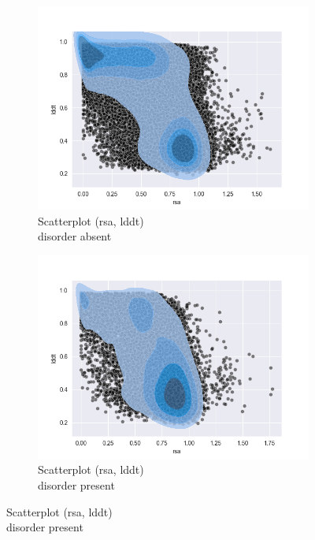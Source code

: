 \begin{figure}[h!]
    \begin{subfigure}{0.5\linewidth}
        \includegraphics[width=\linewidth]{res/analysis/plots/dis0-scatter_rsa-lddt.png}
        \caption{Scatterplot (rsa, lddt)\\disorder absent}
    \end{subfigure}
    \begin{subfigure}{0.5\linewidth}
        \includegraphics[width=\linewidth]{res/analysis/plots/dis1-scatter_rsa-lddt.png}
        \caption{Scatterplot (rsa, lddt)\\disorder present}
    \end{subfigure}
\end{figure}

